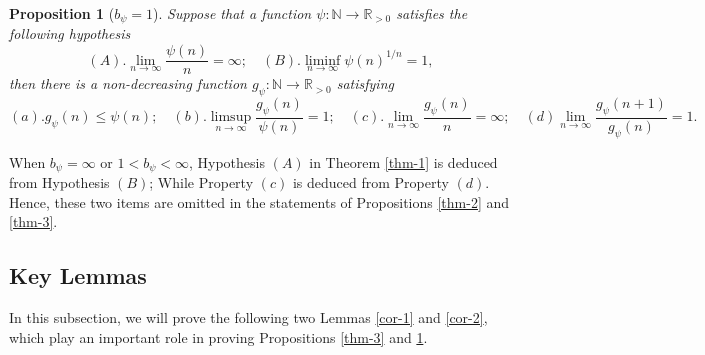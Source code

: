 \documentclass[12pt,reqno]{amsart}
\renewcommand{\=}{\coloneqq}
\theoremstyle{plain}
\newtheorem{prop}[theorem]{Proposition}
\begin{document}
\begin{prop}[$b_{\psi}=1$]\label{thm-4}
Suppose  that a function $\psi : \mathbb{N} \to \mathbb{R}_{>0}$ satisfies the following hypothesis
\begin{equation*}\label{equ-5}
(A). \lim_{n\to \infty} \frac{\psi(n)}{n} = \infty; \quad (B). \liminf_{n\to \infty} {\psi(n)}^{1/n} = 1,
\end{equation*}
then there is a non-decreasing function $g_\psi : \mathbb{N} \to \mathbb{R}_{>0}$ satisfying
\begin{equation*}\label{equ-6}
(a). g_\psi(n) \leq \psi(n); \quad (b). \limsup_{n\to \infty}\frac{g_\psi(n)}{\psi(n)} = 1; \quad (c). \lim_{n\to \infty} \frac{g_\psi(n)}{n} = \infty; \quad (d)\lim_{n\to \infty} \frac{g_\psi(n+1)}{g_\psi(n)} = 1.
\end{equation*}
\end{prop}

When $b_{\psi}=\infty$ or $1<b_{\psi}<\infty$,  Hypothesis $(A)$ in Theorem \ref{thm-1} is deduced from Hypothesis $(B)$; While Property $(c)$ is deduced from Property $(d)$. Hence, these two items are omitted in the statements of Propositions \ref{thm-2} and \ref{thm-3}.
		
\subsection{Key Lemmas}\label{subs.lemcor}
In this subsection, we will prove the following two Lemmas \ref{cor-1} and \ref{cor-2}, which play an important role in proving Propositions \ref{thm-3} and \ref{thm-4}.
\end{document}
